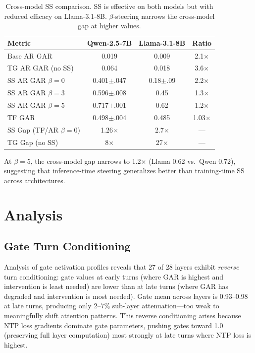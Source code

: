 \documentclass[11pt,a4paper]{article}
\begin{document}
\begin{table}[t]
\centering
\small
\caption{Cross-model SS comparison. SS is effective on both models but with reduced efficacy on Llama-3.1-8B. $\beta$-steering narrows the cross-model gap at higher values.}
\label{tab:cross_model_ss}
\begin{tabular}{@{}lccc@{}}
\toprule
Metric & Qwen-2.5-7B & Llama-3.1-8B & Ratio \\
\midrule
Base AR GAR & 0.019 & 0.009 & 2.1$\times$ \\
TG AR GAR (no SS) & 0.064 & 0.018 & 3.6$\times$ \\
SS AR GAR $\beta{=}0$ & 0.401$\pm$.047 & 0.18$\pm$.09 & 2.2$\times$ \\
SS AR GAR $\beta{=}3$ & 0.596$\pm$.008 & 0.45 & 1.3$\times$ \\
SS AR GAR $\beta{=}5$ & 0.717$\pm$.001 & 0.62 & 1.2$\times$ \\
TF GAR & 0.498$\pm$.004 & 0.485 & 1.03$\times$ \\
SS Gap (TF/AR $\beta{=}0$) & 1.26$\times$ & 2.7$\times$ & --- \\
TG Gap (no SS) & 8$\times$ & 27$\times$ & --- \\
\bottomrule
\end{tabular}
\end{table}

At $\beta{=}5$, the cross-model gap narrows to 1.2$\times$ (Llama 0.62 vs.\ Qwen 0.72), suggesting that inference-time steering generalizes better than training-time SS across architectures.

\section{Analysis}

\subsection{Gate Turn Conditioning}

Analysis of gate activation profiles reveals that 27 of 28 layers exhibit \emph{reverse} turn conditioning: gate values at early turns (where GAR is highest and intervention is least needed) are lower than at late turns (where GAR has degraded and intervention is most needed). Gate mean across layers is 0.93--0.98 at late turns, producing only 2--7\% sub-layer attenuation---too weak to meaningfully shift attention patterns. This reverse conditioning arises because NTP loss gradients dominate gate parameters, pushing gates toward 1.0 (preserving full layer computation) most strongly at late turns where NTP loss is highest.
\end{document}
